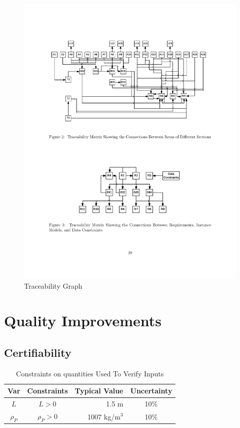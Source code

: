 \documentclass[sigconf]{acmart}
\begin{document}
\begin{figure}[htpb]
\begin{center}
\includegraphics[scale=0.45]{./figures/TraceGraph.pdf}
\end{center}
\caption{Traceability Graph}
\label{Fig_JtolDrasil}
\end{figure}

\section{Quality Improvements} \label{SecQuality}

\subsection{Certifiability}

\begin{table} 
\centering
\caption{Constraints on quantities Used To Verify Inputs}
\begin{tabular}{c c r c } 
\toprule
\textbf{Var} & \textbf{Constraints} & \textbf{Typical Value} & \textbf{Uncertainty}\\ \midrule
$L$ & $L > 0$ & 1.5 m & 10\% \\ 
$\rho_P$ & $\rho_P > 0$	& 1007 kg/m$^3$	& 10\% \\
\bottomrule
\end{tabular}
\label{tab:pcm}
\end{table}
\end{document}
